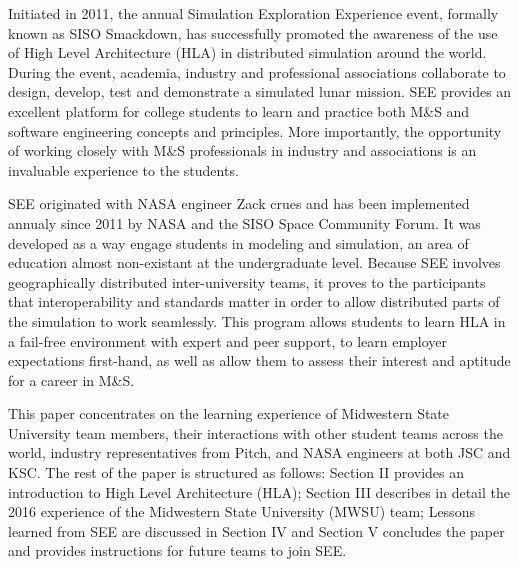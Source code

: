 \documentclass[journal, onecolumn]{IEEEtran}
\begin{document}
Initiated in 2011, the annual Simulation Exploration Experience event, formally known as SISO Smackdown, has successfully promoted the awareness of the use of High Level Architecture (HLA) in distributed simulation around the world. During the event, academia, industry and professional associations collaborate to design, develop, test and demonstrate a simulated lunar mission. SEE provides an excellent platform for college students to learn and practice both M\&S and software engineering concepts and principles. More importantly, the opportunity of working closely with M\&S professionals in industry and associations is an invaluable experience to the students. 

SEE originated with NASA engineer Zack crues and has been implemented annualy since 2011 by NASA and the SISO Space Community Forum.  It was developed as a way engage students in modeling and simulation, an area of education almost non-existant at the undergraduate level.  Because SEE involves geographically distributed inter-university teams, it proves to the participants that interoperability and standards matter in order to allow distributed parts of the simulation to work seamlessly. This program allows students to learn HLA in a fail-free environment with expert and peer support, to learn employer expectations first-hand, as well as allow them to assess their interest and aptitude for a career in M\&S.  

This paper concentrates on the learning experience of Midwestern State University team members, their interactions with other student teams across the world, industry representatives from Pitch, and NASA engineers at both JSC and KSC.  The rest of the paper is structured as follows: Section II provides an introduction to High Level Architecture (HLA); Section III describes in detail the 2016 experience of the Midwestern State University (MWSU) team; Lessons learned from SEE are discussed in Section IV and Section V concludes the paper and provides instructions for future teams to join SEE.
\end{document}
